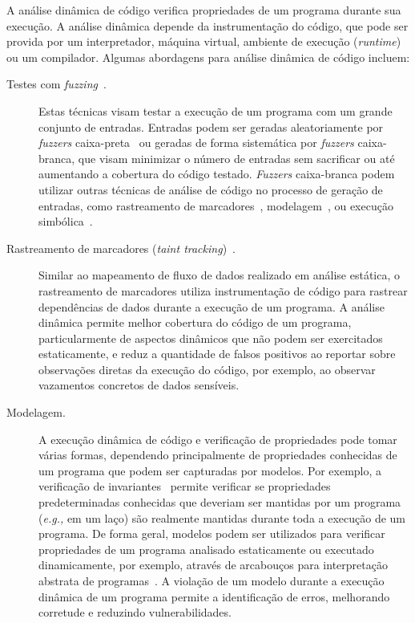 A análise dinâmica de código verifica propriedades de um programa durante sua execução. A análise dinâmica depende da instrumentação do código, que pode ser provida por um interpretador, máquina virtual, ambiente de execução (\emph{runtime}) ou um compilador. Algumas abordagens para análise dinâmica de código incluem:

\begin{description}

  \item[Testes com \emph{fuzzing}~\cite{pewny14signatures, sutton2007fuzzing, takanen2018fuzzing}.] Estas técnicas visam testar a execução de um programa com um grande conjunto de entradas. Entradas podem ser geradas aleatoriamente por \emph{fuzzers} caixa-preta~\cite{takanen2018fuzzing} ou geradas de forma sistemática por \emph{fuzzers} caixa-branca, que visam minimizar o número de entradas sem sacrificar ou até aumentando a cobertura do código testado.
  \emph{Fuzzers} caixa-branca podem utilizar outras técnicas de análise de código no processo de geração de entradas, como rastreamento de marcadores~\cite{ganesh2009fuzzing}, modelagem~\cite{pham2016fuzzing}, ou execução simbólica~\cite{godefroid2008fuzzing}.

  \item[Rastreamento de marcadores (\emph{taint tracking})~\cite{newsome2005dynamic, portokalidis06argos, tian2023podft, she2020neutaint}.]  Similar ao mapeamento de fluxo de dados realizado em análise estática, o rastreamento de marcadores utiliza instrumentação de código para rastrear dependências de dados durante a execução de um programa. A análise dinâmica permite melhor cobertura do código de um programa, particularmente de aspectos dinâmicos que não podem ser exercitados estaticamente, e reduz a quantidade de falsos positivos ao reportar sobre observações diretas da execução do código, por exemplo, ao observar vazamentos concretos de dados sensíveis.

  \item[Modelagem.] A execução dinâmica de código e verificação de propriedades pode tomar várias formas, dependendo principalmente de propriedades conhecidas de um programa que podem ser capturadas por modelos. Por exemplo, a verificação de invariantes~\cite{lin2021inferring, lin2021inferring} permite verificar se propriedades predeterminadas conhecidas que deveriam ser mantidas por um programa (\emph{e.g.,} em um laço) são realmente mantidas durante toda a execução de um programa.  De forma geral, modelos podem ser utilizados para verificar propriedades de um programa analisado estaticamente ou executado dinamicamente, por exemplo, através de arcabouços para interpretação abstrata de programas~\cite{stein2021demanded, vedrine2021runtime}.  A violação de um modelo durante a execução dinâmica de um programa permite a identificação de erros, melhorando corretude e reduzindo vulnerabilidades.


\end{description}
